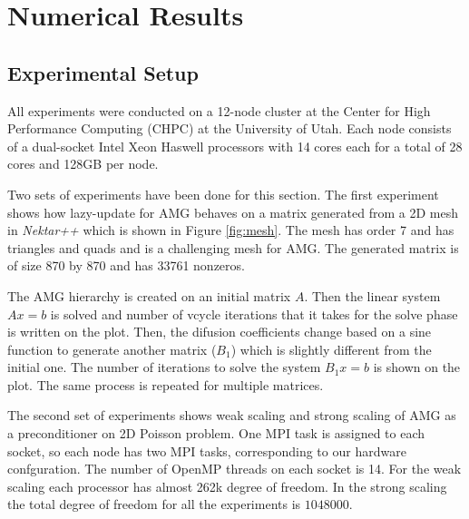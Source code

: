 \section{Numerical Results}
\label{sec:results} %

\subsection{Experimental Setup}

All experiments were conducted on a 12-node cluster at the Center for High Performance Computing (CHPC) at 
the University of Utah. Each node consists of a dual-socket Intel Xeon Haswell processors with 14 cores each 
for a total of 28 cores and 128GB per node. 


Two sets of experiments have been done for this section. The first experiment shows how lazy-update for AMG behaves on a matrix
generated from a 2D mesh in \textit{Nektar++} which is shown in Figure \ref{fig:mesh}. The mesh has order 7 and has triangles and
quads and is a challenging mesh for AMG. The generated matrix is of size 870 by 870 and has 33761 nonzeros.

The AMG hierarchy is created on an initial matrix $A$. Then the linear system 
$Ax = b$ is solved and number of vcycle iterations that it takes for the solve phase is written on the plot.
Then, the difusion coefficients change based on a sine function to generate another matrix ($B_1$) which is slightly 
different from the initial one. The number of iterations to solve the system $B_1x = b$ is shown on the plot.
The same process is repeated for multiple matrices.

The second set of experiments shows weak scaling and strong scaling of AMG as a preconditioner on 2D Poisson problem.
One MPI task is assigned to each socket, so each node has two MPI tasks, corresponding to our hardware confguration. 
The number of OpenMP threads on each socket is 14.
For the weak scaling each processor has almost 262k degree of freedom. In the strong scaling the total degree of freedom for all
the experiments is $1048000$.

